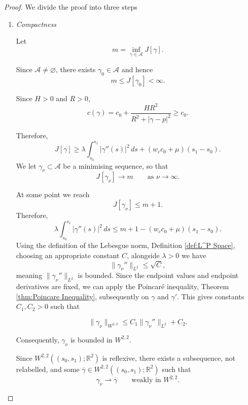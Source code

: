 \begin{proof}
    We divide the proof into three steps 
\begin{enumerate}
        \item[(i)] \textit{Compactness}
        
        Let
        $$
        m=\inf_{\gamma\in\mathcal{A}}J[\gamma].
        $$
        
        Since $\mathcal{A}\neq\varnothing$, there exists $\gamma_0\in\mathcal{A}$ and hence
        $$
        m\leq J[\gamma_0]<\infty.
        $$
        
        Since $H>0$ and $R>0$,
        $$
        c(\gamma)
        =
        c_0+
        \frac{HR^2}{R^2+|\gamma-p|^2}
        \geq c_0.
        $$
        
        Therefore,
        $$
        J[\gamma]
        \geq
        \lambda\int_{s_0}^{s_1}|\gamma''(s)|^2\,ds
        +
        (w_cc_0+\mu)(s_1-s_0).
        $$
        We let ${\gamma_\nu}\subset\mathcal{A}$ be a minimising sequence, so that
        $$
        J[\gamma_\nu]\longrightarrow m
        \qquad\text{as }\nu\rightarrow\infty.
        $$

        At some point we reach
        \[
        J[\gamma_\nu] \leq m +1.
        \]
        Therefore,
        \[
        \lambda\int_{s_0}^{s_1}|\gamma''(s)|^2\,ds
        \leq m+1 -
        (w_cc_0+\mu)(s_1-s_0).
        \]
        Using the definition of the Lebesgue norm, Definition \ref{def:L^P Space}, choosing an appropriate constant $C$, alongside $\lambda>0$ we have
        $$
        \|\gamma_\nu''\|_{L^2} \leq \sqrt{C},
        $$
        meaning $\|\gamma_\nu''\|_{L^2}$ is bounded. Since the endpoint values and endpoint derivatives are fixed, we can apply the Poincar\'e inequality, Theorem \ref{thm:Poincare Inequality}, subsequently on $\gamma$ and $\gamma '$. This gives constants $C_1,C_2>0$ such that
        
        $$
        \|\gamma_\nu\|_{W^{2,2}}
        \leq
        C_1\|\gamma_\nu''\|_{L^2}+C_2.
        $$
        
        Consequently, ${\gamma_\nu}$ is bounded in $W^{2,2}$.
        
        Since $W^{2,2}((s_0,s_1);\mathbb{R}^2)$ is reflexive, there exists a subsequence, not relabelled, and some $\overline{\gamma}\in W^{2,2}((s_0,s_1);\mathbb{R}^2)$ such that
        $$
        \gamma_\nu\rightharpoonup\overline{\gamma}
        \qquad\text{weakly in }W^{2,2}.
        $$
        

\end{enumerate}
\end{proof}
